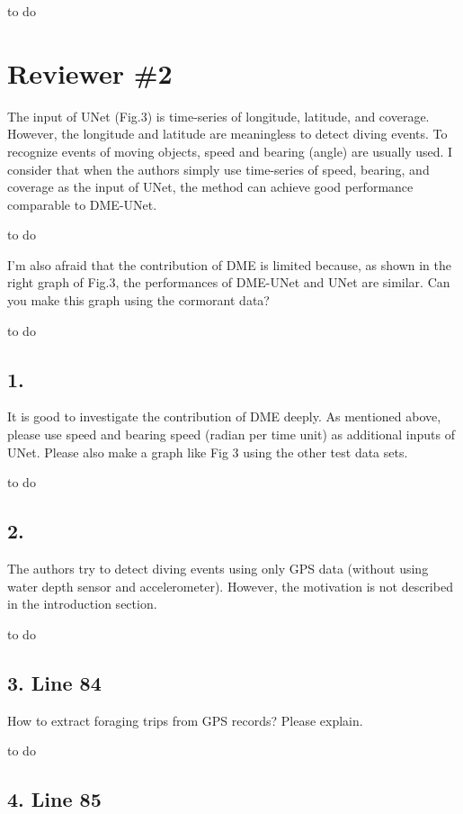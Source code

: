 \documentclass{ar2rc}
\begin{document}
\AR to do

\section*{Reviewer \#2}


\RC The input of UNet (Fig.3) is time-series of longitude, latitude, and coverage. However, the longitude and latitude are meaningless to detect diving events. To recognize events of moving objects, speed and bearing (angle) are usually used. I consider that when the authors simply use time-series of speed, bearing, and coverage as the input of UNet, the method can achieve good performance comparable to DME-UNet.

\AR to do


\RC I'm also afraid that the contribution of DME is limited because, as shown in the right graph of Fig.3, the performances of DME-UNet and UNet are similar. Can you make this graph using the cormorant data?

\AR to do

\subsection*{1.}

\RC  It is good to investigate the contribution of DME deeply. As mentioned above, please use speed and bearing speed (radian per time unit) as additional inputs of UNet. Please also make a graph like Fig 3 using the other test data sets.

\AR to do

\subsection*{2.}

\RC The authors try to detect diving events using only GPS data (without using water depth sensor and accelerometer). However, the motivation is not described in the introduction section.

\AR to do

\subsection*{3. Line 84}

\RC How to extract foraging trips from GPS records? Please explain.

\AR to do

\subsection*{4. Line 85}
\end{document}
